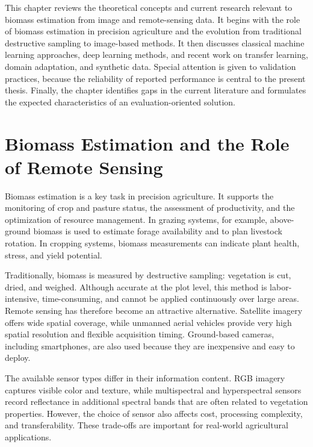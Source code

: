 

This chapter reviews the theoretical concepts and current research relevant to biomass estimation from image and remote-sensing data. It begins with the role of biomass estimation in precision agriculture and the evolution from traditional destructive sampling to image-based methods. It then discusses classical machine learning approaches, deep learning methods, and recent work on transfer learning, domain adaptation, and synthetic data. Special attention is given to validation practices, because the reliability of reported performance is central to the present thesis. Finally, the chapter identifies gaps in the current literature and formulates the expected characteristics of an evaluation-oriented solution.

\section{Biomass Estimation and the Role of Remote Sensing}

Biomass estimation is a key task in precision agriculture. It supports the monitoring of crop and pasture status, the assessment of productivity, and the optimization of resource management. In grazing systems, for example, above-ground biomass is used to estimate forage availability and to plan livestock rotation. In cropping systems, biomass measurements can indicate plant health, stress, and yield potential.

Traditionally, biomass is measured by destructive sampling: vegetation is cut, dried, and weighed. Although accurate at the plot level, this method is labor-intensive, time-consuming, and cannot be applied continuously over large areas. Remote sensing has therefore become an attractive alternative. Satellite imagery offers wide spatial coverage, while unmanned aerial vehicles provide very high spatial resolution and flexible acquisition timing. Ground-based cameras, including smartphones, are also used because they are inexpensive and easy to deploy.

The available sensor types differ in their information content. RGB imagery captures visible color and texture, while multispectral and hyperspectral sensors record reflectance in additional spectral bands that are often related to vegetation properties. However, the choice of sensor also affects cost, processing complexity, and transferability. These trade-offs are important for real-world agricultural applications.


